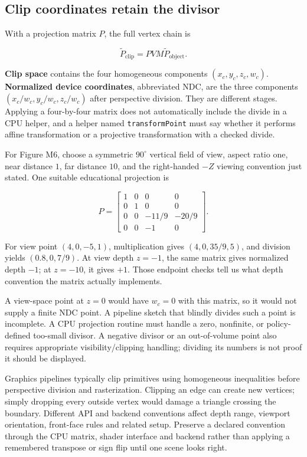 \subsection{Clip coordinates retain the divisor}\label{01-foundations-i-ch019-clip-coordinates-retain-the-divisor}

With a projection matrix \(P\), the full vertex chain is

\[
\widetilde P_{\mathrm{clip}}=PVM\widetilde P_{\mathrm{object}}.
\]

\textbf{Clip space} contains the four homogeneous components \((x_c,y_c,z_c,w_c)\). \textbf{Normalized device coordinates}, abbreviated NDC, are the three components \((x_c/w_c,y_c/w_c,z_c/w_c)\) after perspective division. They are different stages. Applying a four-by-four matrix does not automatically include the divide in a CPU helper, and a helper named \texttt{transformPoint} must say whether it performs affine transformation or a projective transformation with a checked divide.

For Figure M6, choose a symmetric \(90^\circ\) vertical field of view, aspect ratio one, near distance \(1\), far distance \(10\), and the right-handed \(-Z\) viewing convention just stated. One suitable educational projection is

\[
P=\begin{bmatrix}
1&0&0&0\\
0&1&0&0\\
0&0&-11/9&-20/9\\
0&0&-1&0
\end{bmatrix}.
\]

For view point \((4,0,-5,1)\), multiplication gives \((4,0,35/9,5)\), and division yields \((0.8,0,7/9)\). At view depth \(z=-1\), the same matrix gives normalized depth \(-1\); at \(z=-10\), it gives \(+1\). Those endpoint checks tell us what depth convention the matrix actually implements.

A view-space point at \(z=0\) would have \(w_c=0\) with this matrix, so it would not supply a finite NDC point. A pipeline sketch that blindly divides such a point is incomplete. A CPU projection routine must handle a zero, nonfinite, or policy-defined too-small divisor. A negative divisor or an out-of-volume point also requires appropriate visibility/clipping handling; dividing its numbers is not proof it should be displayed.

Graphics pipelines typically clip primitives using homogeneous inequalities before perspective division and rasterization. Clipping an edge can create new vertices; simply dropping every outside vertex would damage a triangle crossing the boundary. Different API and backend conventions affect depth range, viewport orientation, front-face rules and related setup. Preserve a declared convention through the CPU matrix, shader interface and backend rather than applying a remembered transpose or sign flip until one scene looks right.

